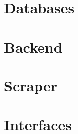 %
%

\chapter{Databases}


%
%

\chapter{Backend}


%
%

\chapter{Scraper}


%
%

\chapter{Interfaces}
